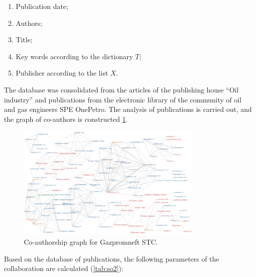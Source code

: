 \documentclass[12pt]{report}
\theoremstyle{definition}
\providecommand{\tightlist}{%
	\setlength{\itemsep}{0pt}\setlength{\parskip}{0pt}}
\begin{document}
\begin{enumerate}
	\tightlist
	\item Publication date;
	\item Authors;
	\item Title;
	\item Key words according to the dictionary $T$;
	\item Publisher according to the list $X$.
\end{enumerate}


The database was consolidated from the articles of the publishing house ``Oil industry'' and publications from the electronic library of the community of oil and gas engineers SPE OnePetro.
The analysis of publications is carried out, and the graph of co-authors is constructed \ref{fig:so3}.

\begin{figure}[ht]
	\centering
	\includegraphics[width=0.8\textwidth]{so3}
	\caption{Co-authorship graph for Gazpromneft STC.}
	\label{fig:so3}
\end{figure}

Based on the database of publications, the following parameters of the collaboration are calculated (\ref{tab:so2}):

\begin{table}[H]
	\centering
	\caption{The results of the direct measurement of the STC activities.}
	\label{tab:so2}
\end{table}
\end{document}

